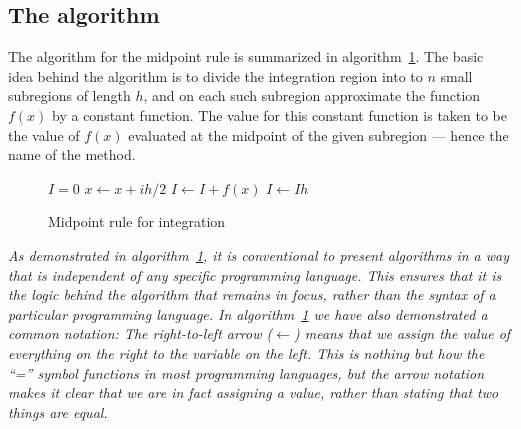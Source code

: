 \documentclass[english,notitlepage,reprint,nofootinbib]{revtex4-1}  %
\begin{document}
\subsection*{The algorithm}
%
The algorithm for the midpoint rule is summarized in algorithm~\ref{algo:midpointrule}. The basic idea behind the algorithm is to divide the integration region into to $n$ small subregions of length $h$, and on each such subregion approximate the function $f(x)$ by a constant function. The value for this constant function is taken to be the value of $f(x)$ evaluated at the midpoint of the given subregion --- hence the name of the method.
%
\begin{figure}   
    \begin{algorithm}[H]
    \caption{Midpoint rule for integration}
    \label{algo:midpointrule}
        \begin{algorithmic} 
            \State $I = 0$ 
            \State $x \leftarrow x + ih/2$    %
            \State $I \leftarrow I + f(x)$  %
            \EndFor
            \State $I \leftarrow Ih$ 
            \EndProcedure
        \end{algorithmic}
    \end{algorithm}
\end{figure}

\textit{As demonstrated in algorithm~\ref{algo:midpointrule}, it is conventional to present algorithms in a way that is independent of any specific programming language. This ensures that it is the logic behind the algorithm that remains in focus, rather than the syntax of a particular programming language. In algorithm~\ref{algo:midpointrule} we have also demonstrated a common notation: The right-to-left arrow ($\leftarrow$) means that we assign the value of everything on the right to the variable on the left. This is nothing but how the ``='' symbol functions in most programming languages, but the arrow notation makes it clear that we are in fact assigning a value, rather than stating that two things are equal.}
\end{document}
